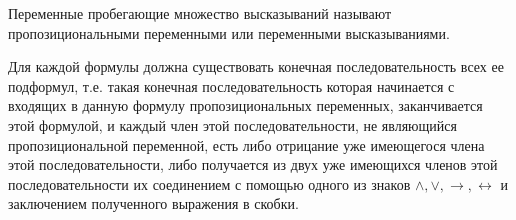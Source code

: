 Переменные пробегающие множество высказываний называют пропозициональными
переменными или переменными высказываниями.

Для каждой формулы должна существовать конечная последовательность всех ее
подформул, т.е. такая конечная последовательность которая начинается с входящих
в данную формулу пропозициональных переменных, заканчивается этой формулой, и
каждый член этой последовательности, не являющийся пропозициональной переменной,
есть либо отрицание уже имеющегося члена этой последовательности, либо
получается из двух уже имеющихся членов этой последовательности их соединением с
помощью одного из знаков $\land,\lor,\rightarrow,\leftrightarrow$ и заключением
полученного выражения в скобки.


